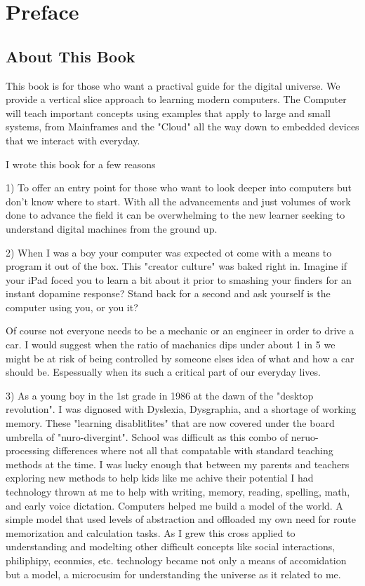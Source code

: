 \chapter*{Preface}
\section*{About This Book}

This book is for those who want a practival guide for the digital universe. We provide a vertical slice approach to learning modern computers. The Computer will teach important concepts using examples that apply to large and small systems, from Mainframes and the "Cloud" all the way down to embedded devices that we interact with everyday.

I wrote this book for a few reasons

1) To offer an entry point for those who want to  look deeper into computers but don't know where to start. With all the advancements and just volumes of work done to advance the field it can be overwhelming to the new learner seeking to understand digital machines from the ground up.

2) When I was a boy your computer was expected ot come with a means to program it out of the box. This "creator culture" was baked right in. Imagine if your iPad foced you to learn a bit about it prior to smashing your finders for an instant dopamine response? Stand back for a second and ask yourself is the computer using you, or you it?

Of course not everyone needs to be a mechanic or an engineer in order to drive a car. I would suggest when the ratio of machanics dips under about 1 in 5 we might be at risk of being controlled by someone elses idea of what and how a car should be. Espessually when its such a critical part of our everyday lives.

3) As a young boy in the 1st grade in 1986 at the dawn of the "desktop revolution". I was dignosed with Dyslexia, Dysgraphia, and a shortage of working memory. These "learning disablitlites" that are now covered under the board umbrella of "nuro-divergint". School was difficult as this combo of neruo-processing differences where not all that compatable with standard teaching methods at the time. I was lucky enough that between my parents and teachers exploring new methods to help kids like me achive their potential I had technology thrown at me to help with writing, memory, reading, spelling, math, and early voice dictation. Computers helped me build a model of the world. A simple model that used levels of abstraction and offloaded my own need for route memorization and calculation tasks. As I grew this cross applied to understanding and modelting other difficult concepts like social interactions, philiphipy, econmics, etc. technology became not only a means of accomidation but a model, a microcusim for understanding the universe as it related to me.

